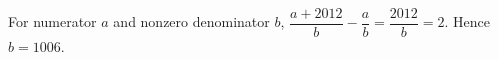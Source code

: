 For numerator $a$ and nonzero denominator $b$, $\dfrac{a+2012}{b}-\dfrac{a}{b}=\dfrac{2012}{b}=2$. Hence $\boxed{b=1006}$.
